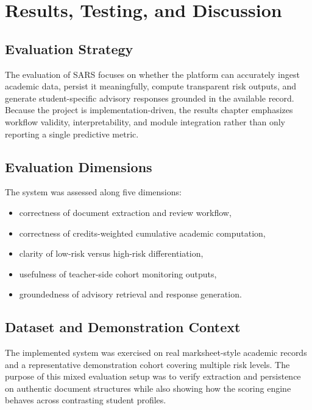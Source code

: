 \chapter{Results, Testing, and Discussion}

\section{Evaluation Strategy}
The evaluation of SARS focuses on whether the platform can accurately ingest academic data, persist it meaningfully, compute transparent risk outputs, and generate student-specific advisory responses grounded in the available record. Because the project is implementation-driven, the results chapter emphasizes workflow validity, interpretability, and module integration rather than only reporting a single predictive metric.

\section{Evaluation Dimensions}
The system was assessed along five dimensions:
\begin{itemize}[leftmargin=*]
\item correctness of document extraction and review workflow,
\item correctness of credits-weighted cumulative academic computation,
\item clarity of low-risk versus high-risk differentiation,
\item usefulness of teacher-side cohort monitoring outputs,
\item groundedness of advisory retrieval and response generation.
\end{itemize}

\section{Dataset and Demonstration Context}
The implemented system was exercised on real marksheet-style academic records and a representative demonstration cohort covering multiple risk levels. The purpose of this mixed evaluation setup was to verify extraction and persistence on authentic document structures while also showing how the scoring engine behaves across contrasting student profiles.

